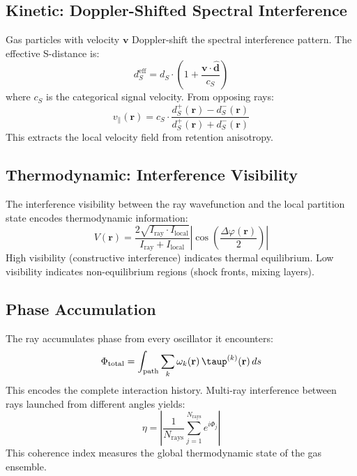 \subsection{Kinetic: Doppler-Shifted Spectral Interference}

Gas particles with velocity $\mathbf{v}$ Doppler-shift the spectral interference pattern. The effective S-distance is:
\begin{equation}
    d_S^{\mathrm{eff}} = d_S \cdot \left(1 + \frac{\mathbf{v} \cdot \hat{\mathbf{d}}}{c_S}\right)
\end{equation}
where $c_S$ is the categorical signal velocity. From opposing rays:
\begin{equation}
    v_{\parallel}(\mathbf{r}) = c_S \cdot \frac{d_S^+({\mathbf{r}}) - d_S^-(\mathbf{r})}{d_S^+(\mathbf{r}) + d_S^-(\mathbf{r})}
\end{equation}
This extracts the local velocity field from retention anisotropy.

\subsection{Thermodynamic: Interference Visibility}

The interference visibility between the ray wavefunction and the local partition state encodes thermodynamic information:
\begin{equation}
    V(\mathbf{r}) = \frac{2\sqrt{I_{\mathrm{ray}} \cdot I_{\mathrm{local}}}}{I_{\mathrm{ray}} + I_{\mathrm{local}}} \left|\cos\!\left(\frac{\Delta\varphi(\mathbf{r})}{2}\right)\right|
\end{equation}
High visibility (constructive interference) indicates thermal equilibrium. Low visibility indicates non-equilibrium regions (shock fronts, mixing layers).

\subsection{Phase Accumulation}

The ray accumulates phase from every oscillator it encounters:
\begin{equation}
    \Phi_{\mathrm{total}} = \int_{\mathrm{path}} \sum_k \omega_k(\mathbf{r})\, \taup^{(k)}(\mathbf{r})\, ds
\end{equation}
This encodes the complete interaction history. Multi-ray interference between rays launched from different angles yields:
\begin{equation}
    \eta = \left|\frac{1}{N_{\mathrm{rays}}} \sum_{j=1}^{N_{\mathrm{rays}}} e^{i\Phi_j}\right|
\end{equation}
This coherence index measures the global thermodynamic state of the gas ensemble.

